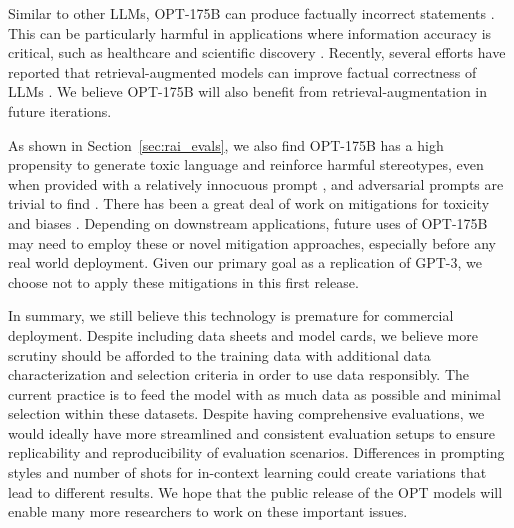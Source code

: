 Similar to other LLMs, {OPT-175B} can produce factually incorrect statements \cite{adiwardana2020meena,brown2020gpt3, roller-etal-2021-recipes,gopher2022,palm2022,thoppilan2022lamda}. This can be particularly harmful in applications where information accuracy is critical, such as healthcare and scientific discovery \cite{weidinger2021ethical}. Recently, several efforts have reported that retrieval-augmented models can improve factual correctness of LLMs \cite{lewis2020retrieval,komeili2021woi,thoppilan2022lamda,borgeaud2021improving,shuster2022language,nakano2021webgpt}. We believe {OPT-175B} will also benefit from retrieval-augmentation in future iterations.

As shown in Section~\ref{sec:rai_evals}, we also find {OPT-175B} has a high propensity to generate toxic language and reinforce harmful stereotypes, even when provided with a relatively innocuous prompt \cite{gehman2020realtoxicityprompts}, and adversarial prompts are trivial to find \cite{dinan2021anticipating}. There has been a great deal of work on mitigations for toxicity and biases \cite{dathathri2019plug,dinan2019build,sheng2019woman,dinan-etal-2020-queens,liu2019does,krause2020gedi,xu2020recipes,liang2021towards,dinan2021anticipating,xu-etal-2021-bot,dhamala2021bold,schick2021self,ouyang2022training}. Depending on downstream applications, future uses of {OPT-175B} may need to employ these or novel mitigation approaches, especially before any real world deployment. Given our primary goal as a replication of {GPT-3}, we choose not to apply these mitigations in this first release.

In summary, we still believe this technology is premature for commercial deployment. Despite including data sheets and model cards, we believe more scrutiny should be afforded to the training data with additional data characterization and selection criteria in order to use data responsibly. The current practice is to feed the model with as much data as possible and minimal selection within these datasets. Despite having comprehensive evaluations, we would ideally have more streamlined and consistent evaluation setups to ensure replicability and reproducibility of evaluation scenarios. Differences in prompting styles and number of shots for in-context learning could create variations that lead to different results. We hope that the public release of the OPT models will enable many more researchers to work on these important issues.

